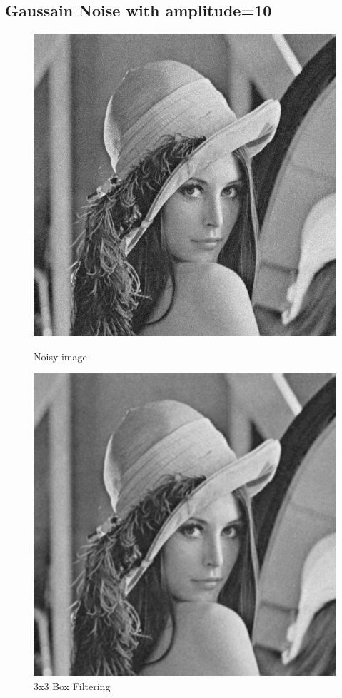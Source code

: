 \documentclass{article}
\begin{document}
\subsection{Gaussain Noise with amplitude=10}
\begin{figure}[H]
  \includegraphics[width=\linewidth]{img/g10.png}
  \caption{Noisy image}\label{fig:g10}
\endminipage\hfill
{}
  \includegraphics[width=\linewidth]{img/g10_box_3x3.png}
  \caption{3x3 Box Filtering}\label{fig:g10_box_3x3}
\endminipage\hfill
\end{figure}
\end{document}
